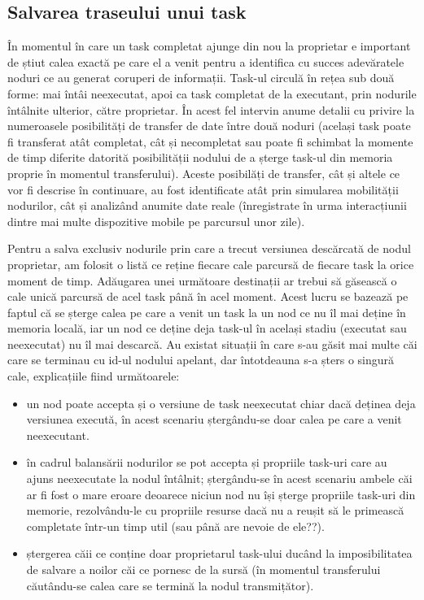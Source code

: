 \documentclass[12pt,a4paper]{report}
\begin{document}
\subsection{Salvarea traseului unui task}

În momentul în care un task completat ajunge din nou la proprietar e important de știut calea exactă pe care el a venit pentru a identifica cu succes adevăratele noduri ce au generat coruperi de informații. Task-ul circulă în rețea sub două forme: mai întâi neexecutat, apoi ca task completat de la executant, prin nodurile întâlnite ulterior, către proprietar. În acest fel intervin anume detalii cu privire la numeroasele posibilități de transfer de date între două noduri (același task poate fi transferat atât completat, cât și necompletat sau poate fi schimbat la momente de timp diferite datorită posibilității nodului de a șterge task-ul din memoria proprie în momentul transferului). Aceste posibilăți de transfer, cât și altele ce vor fi descrise în continuare, au fost identificate atât prin simularea mobilității nodurilor, cât și analizând anumite date reale (înregistrate în urma interacțiunii dintre mai multe dispozitive mobile pe parcursul unor zile).

Pentru a salva exclusiv nodurile prin care a trecut versiunea descărcată de nodul proprietar, am folosit o listă ce reține fiecare cale parcursă de fiecare task la orice moment de timp. Adăugarea unei următoare destinații ar trebui să găsească o cale unică parcursă de acel task până în acel moment. Acest lucru se bazează pe faptul că se șterge calea pe care a venit un task la un nod ce nu îl mai deține în memoria locală, iar un nod ce deține deja task-ul în același stadiu (executat sau neexecutat) nu îl mai descarcă. Au existat situații în care s-au găsit mai multe căi care se terminau cu id-ul nodului apelant, dar întotdeauna s-a șters o singură cale, explicațiile fiind următoarele:
\begin{itemize}
	\item un nod poate accepta și o versiune de task neexecutat chiar dacă deținea deja versiunea execută, în acest scenariu ștergându-se doar calea pe care a venit neexecutant.
	\item în cadrul balansării nodurilor se pot accepta și propriile task-uri care au ajuns neexecutate la nodul întâlnit; ștergându-se în acest scenariu ambele căi ar fi fost o mare eroare deoarece niciun nod nu își șterge propriile task-uri din memorie, rezolvându-le cu propriile resurse dacă nu a reușit să le primească completate într-un timp util (sau până are nevoie de ele??).
	\item ștergerea căii ce conține doar proprietarul task-ului ducând la imposibilitatea de salvare a noilor căi ce pornesc de la sursă (în momentul transferului căutându-se calea care se termină la nodul transmițător).
\end{itemize}
\end{document}

